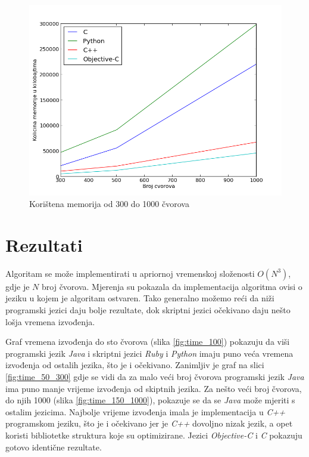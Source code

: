 \documentclass[times, utf8, seminar, numeric]{fer}
\begin{document}
\begin{figure}[!h]
\centering
\includegraphics[scale=0.6]{./img/memorija_1000.png}
\caption{Korištena memorija od 300 do 1000 čvorova}
\label{fig:memorija_1000}
\end{figure}

\section{Rezultati}
Algoritam se može implementirati u apriornoj vremenskoj složenosti $O(N^3)$, gdje je $N$ broj čvorova. Mjerenja su pokazala da implementacija algoritma ovisi o jeziku u kojem je algoritam ostvaren. Tako generalno možemo reći da niži programski jezici daju bolje rezultate, dok skriptni jezici očekivano daju nešto lošja vremena izvođenja.

Graf vremena izvođenja do sto čvorova (slika \ref{fig:time_100}) pokazuju da viši programski jezik \emph{Java} i skriptni jezici \emph{Ruby} i \emph{Python} imaju puno veća vremena izvođenja od ostalih jezika, što je i očekivano. Zanimljiv je graf na slici \ref{fig:time_50_300} gdje se vidi da za malo veći broj čvorova programski jezik \emph{Java} ima puno manje vrijeme izvođenja od skiptnih jezika. Za nešto veći broj čvorova, do njih 1000 (slika \ref{fig:time_150_1000}), pokazuje se da se \emph{Java} može mjeriti s ostalim jezicima. Najbolje vrijeme izvođenja imala je implementacija u \emph{C++} programskom jeziku, što je i očekivano jer je \emph{C++} dovoljno nizak jezik, a opet koristi bibliotetke struktura koje su optimizirane. Jezici \emph{Objective-C} i \emph{C} pokazuju gotovo identične rezultate.
\end{document}
